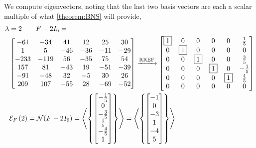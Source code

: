 \documentclass{ximera}
\begin{document}
\begin{example}
  We compute eigenvectors, noting that the last two basis vectors are
  each a scalar multiple of what \ref{theorem:BNS} will provide,
  \begin{align*}
    \lambda&=2\quad\quad F-2I_6=\\
           &
             \begin{bmatrix}
               -61 & -34 & 41 & 12 & 25 & 30\\
               1 & 5 & -46 & -36 & -11 & -29\\
               -233 & -119 & 56 & -35 & 75 & 54\\
               157 & 81 & -43 & 19 & -51 & -39\\
               -91 & -48 & 32 & -5 & 30 & 26\\
               209 & 107 & -55 & 28 & -69 & -52
             \end{bmatrix}
                                            \xrightarrow{\text{RREF}}
                                            \begin{bmatrix}
                                              \fbox{1} & 0 & 0 & 0 & 0 & \frac{1}{5}\\
                                              0 & \fbox{1} & 0 & 0 & 0 & 0\\
                                              0 & 0 & \fbox{1} & 0 & 0 & \frac{3}{5}\\
                                              0 & 0 & 0 & \fbox{1} & 0 & -\frac{1}{5}\\
                                              0 & 0 & 0 & 0 & \fbox{1} & \frac{4}{5}\\
                                              0 & 0 & 0 & 0 & 0 & 0
                                            \end{bmatrix}\\
           &\mathcal{E}_{F}\left(2\right)=\mathcal{N}\!\left(F-2I_6\right)
             =\left\langle\left\{\begin{bmatrix}-\frac{1}{5}\\0\\-\frac{3}{5}\\\frac{1}{5}\\-\frac{4}{5}\\1\end{bmatrix}\right\}\right\rangle
    =\left\langle\left\{\begin{bmatrix}-1\\0\\-3\\1\\-4\\5\end{bmatrix}\right\}\right\rangle\\
  \end{align*}
  \begin{align*}

\end{align*}
\end{example}
\end{document}
